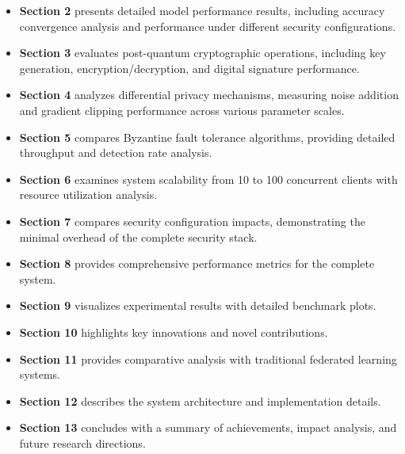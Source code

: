 \documentclass[12pt,a4paper]{article}
\begin{document}
\begin{itemize}
    \item \textbf{Section 2} presents detailed model performance results, including accuracy convergence analysis and performance under different security configurations.
    
    \item \textbf{Section 3} evaluates post-quantum cryptographic operations, including key generation, encryption/decryption, and digital signature performance.
    
    \item \textbf{Section 4} analyzes differential privacy mechanisms, measuring noise addition and gradient clipping performance across various parameter scales.
    
    \item \textbf{Section 5} compares Byzantine fault tolerance algorithms, providing detailed throughput and detection rate analysis.
    
    \item \textbf{Section 6} examines system scalability from 10 to 100 concurrent clients with resource utilization analysis.
    
    \item \textbf{Section 7} compares security configuration impacts, demonstrating the minimal overhead of the complete security stack.
    
    \item \textbf{Section 8} provides comprehensive performance metrics for the complete system.
    
    \item \textbf{Section 9} visualizes experimental results with detailed benchmark plots.
    
    \item \textbf{Section 10} highlights key innovations and novel contributions.
    
    \item \textbf{Section 11} provides comparative analysis with traditional federated learning systems.
    
    \item \textbf{Section 12} describes the system architecture and implementation details.
    
    \item \textbf{Section 13} concludes with a summary of achievements, impact analysis, and future research directions.
\end{itemize}
\end{document}
